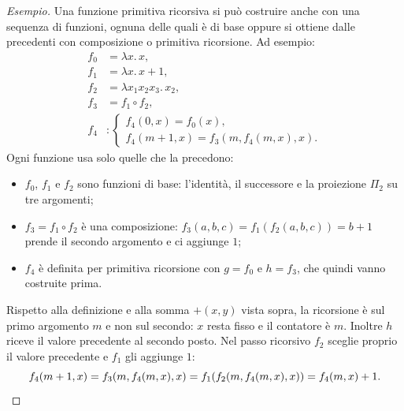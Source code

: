 \documentclass[a4paper, 11pt, oneside]{book}
\theoremstyle{formale}
\newenvironment{esempio}
    {\begin{proof}[\textit{Esempio}]\renewcommand{\qedsymbol}{$\diamond$}}
    {\end{proof}}
\begin{document}
    \begin{esempio}
        Una funzione primitiva ricorsiva si pu\`o costruire anche con una sequenza di
        funzioni, ognuna delle quali \`e di base oppure si ottiene dalle precedenti con
        composizione o primitiva ricorsione. Ad esempio:
        \begin{equation*}
            \begin{aligned}
                f_0 &= \lambda x.\, x, \\
                f_1 &= \lambda x.\, x + 1, \\
                f_2 &= \lambda x_1 x_2 x_3.\, x_2, \\
                f_3 &= f_1 \circ f_2, \\
                f_4 &\colon
                \begin{cases}
                    f_4(0, x) = f_0(x), \\
                    f_4(m + 1, x) = f_3(m, f_4(m, x), x).
                \end{cases}
            \end{aligned}
        \end{equation*}
        Ogni funzione usa solo quelle che la precedono:
        \begin{itemize}
            \item $f_0$, $f_1$ e $f_2$ sono funzioni di base: l'identit\`a, il successore
                e la proiezione $\Pi_2$ su tre argomenti;
            \item $f_3 = f_1 \circ f_2$ \`e una composizione:
                $f_3(a, b, c) = f_1(f_2(a, b, c)) = b + 1$ prende il secondo argomento e
                ci aggiunge $1$;
            \item $f_4$ \`e definita per primitiva ricorsione con $g = f_0$ e
                $h = f_3$, che quindi vanno costruite prima.
        \end{itemize}
        Rispetto alla definizione e alla somma ${+}(x, y)$ vista sopra, la ricorsione
        \`e sul primo argomento $m$ e non sul secondo: $x$ resta fisso e il contatore
        \`e $m$. Inoltre $h$ riceve il valore precedente al secondo posto. Nel passo
        ricorsivo $f_2$ sceglie proprio il valore precedente e $f_1$ gli aggiunge $1$:
        \begin{equation*}
            f_4(m + 1, x) = f_3(m, f_4(m, x), x) = f_1(f_2(m, f_4(m, x), x))
            = f_4(m, x) + 1.\qedhere
        \end{equation*}
    \end{esempio}
\end{document}
